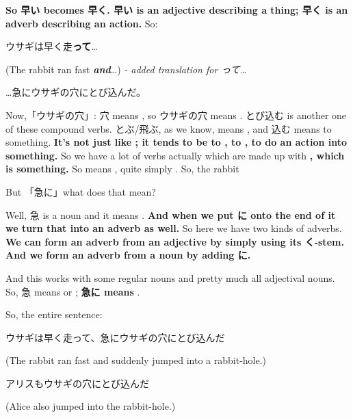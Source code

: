 {}

{\bf So 早い becomes 早く. 早い is an adjective describing a thing; 早く is an adverb describing an action.} So:

\startblockquote
ウサギは早く走{\bf って}\ldots{}
\stopblockquote

(The rabbit ran fast {\bf {\em and}}\ldots{}) {\em - added translation for って\ldots{}}

\startblockquote
\ldots{}急にウサギの穴にとび込んだ。
\stopblockquote

Now,「ウサギの穴」: 穴 means , so ウサギの穴 means . とび込む is another one of these compound verbs. とぶ/飛ぶ, as we know, means , and 込む means to  something. {\bf It's not just like ; it tends to be to , to , to do an action into something.} So we have a lot of verbs actually which are made up with {\bf {}, which is  something.} So  means , quite simply . So, the rabbit 

\thinrule

But 「急に」what does that mean?

{}

Well, 急 is a noun and it means . {\bf And when we put に onto the end of it we turn that into an adverb as well.} So here we have two kinds of adverbs. {\bf We can form an adverb from an adjective by simply using its く-stem.} {\bf And we form an adverb from a noun by adding に.}

{}

And this works with some regular nouns and pretty much all adjectival nouns. So, 急 means  or ; {\bf 急に means }. 

So, the entire sentence:

ウサギは早く走って、急にウサギの穴にとび込んだ

(The rabbit ran fast and suddenly jumped into a rabbit-hole.)

\startblockquote
アリスもウサギの穴にとび込んだ
\stopblockquote

(Alice also jumped into the rabbit-hole.)

\stopsectionlevel

